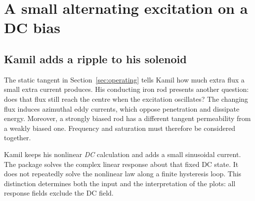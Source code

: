 \section{A small alternating excitation on a DC bias}
\label{sec:biased-harmonic}

\subsection{Kamil adds a ripple to his solenoid}
The static tangent in Section~\ref{sec:operating} tells Kamil how much extra
flux a small extra current produces. His conducting iron rod presents another
question: does that flux still reach the centre when the excitation oscillates?
The changing flux induces azimuthal eddy currents, which oppose penetration
and dissipate energy. Moreover, a strongly biased rod has a different tangent
permeability from a weakly biased one. Frequency and saturation must therefore
be considered together.

Kamil keeps his nonlinear \emph{DC} calculation and adds a small sinusoidal
current. The package solves the complex linear response about that fixed DC
state. It does not repeatedly solve the nonlinear law along a finite hysteresis
loop. This distinction determines both the input and the interpretation of the
plots: all response fields exclude the DC field.

